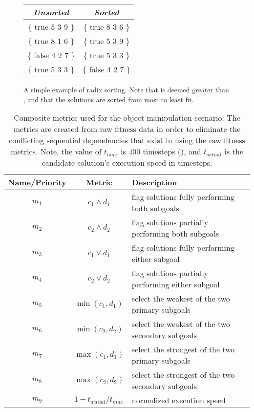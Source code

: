 \begin{figure}[ht]
	\centering
	\begin{tabular}{c|c}

		\emph{Unsorted} & \emph{Sorted} \\
		\hline
		\{ true  5 3 9 \} & \{ true  8 3 6 \} \\
		\{ true  8 1 6 \} & \{ true  5 3 9 \} \\
		\{ false 4 2 7 \} & \{ true  5 3 3 \} \\
		\{ true  5 3 3 \} & \{ false 4 2 7 \} \\

	\end{tabular}
\caption[A simple example of radix sorting.]{A simple example of radix sorting.  Note that \true{} is deemed greater than \false{}, and that the solutions are sorted from most to least fit.}
\label{fig:LexEx}
\end{figure}

\begin{table}[ht]
  \centering
  {
  \small
  \begin{tabular}{|c|c|l|}
    \hline
    Name/Priority & Metric & Description \\
    \hline
    $m_1$ & $c_1 \wedge d_1$ & flag solutions fully performing both subgoals              \\
    $m_2$ & $c_2 \wedge d_2$ & flag solutions partially performing both subgoals          \\
    $m_3$ & $c_1 \vee d_1$   & flag solutions fully performing either subgoal             \\
    $m_4$ & $c_2 \vee d_2$   & flag solutions partially performing either subgoal         \\
    $m_5$ & $\min(c_1,d_1)$  & select the weakest of the two primary subgoals             \\
    $m_6$ & $\min(c_2,d_2)$  & select the weakest of the two secondary subgoals           \\
    $m_7$ & $\max(c_1,d_1)$  & select the strongest of the two primary subgoals           \\
    $m_8$ & $\max(c_2,d_2)$  & select the strongest of the two secondary subgoals         \\
    $m_9$ & $1-t_{actual}/t_{max}$ & normalized execution speed      \\
    \hline
  \end{tabular}
  }
  \caption[Composite metrics used for the object manipulation scenario.]{Composite metrics used for the object manipulation scenario.  The metrics are created from raw fitness data in order to eliminate the conflicting sequential dependencies that exist in using the raw fitness metrics.  Note, the value of $t_{max}$ is 400 timesteps (), and $t_{actual}$ is the candidate solution's execution speed in timesteps.}
  \label{tab:ManipulationMetrics}
\end{table}


